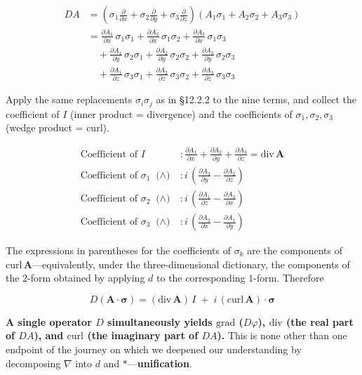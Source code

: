 \[
\begin{aligned}
D A &= (\sigma_1\tfrac{\partial}{\partial x} + \sigma_2\tfrac{\partial}{\partial y} + \sigma_3\tfrac{\partial}{\partial z})(A_1\sigma_1 + A_2\sigma_2 + A_3\sigma_3) \\[4pt]
&= \tfrac{\partial A_1}{\partial x}\,\sigma_1\sigma_1 + \tfrac{\partial A_2}{\partial x}\,\sigma_1\sigma_2 + \tfrac{\partial A_3}{\partial x}\,\sigma_1\sigma_3 \\
&\quad + \tfrac{\partial A_1}{\partial y}\,\sigma_2\sigma_1 + \tfrac{\partial A_2}{\partial y}\,\sigma_2\sigma_2 + \tfrac{\partial A_3}{\partial y}\,\sigma_2\sigma_3 \\
&\quad + \tfrac{\partial A_1}{\partial z}\,\sigma_3\sigma_1 + \tfrac{\partial A_2}{\partial z}\,\sigma_3\sigma_2 + \tfrac{\partial A_3}{\partial z}\,\sigma_3\sigma_3
\end{aligned}
\]

Apply the same replacements \(\sigma_i\sigma_j\) as in §12.2.2 to the
nine terms, and collect the coefficient of \(I\) (inner product =
divergence) and the coefficients of \(\sigma_1,\sigma_2,\sigma_3\)
(wedge product = curl).

\[
\begin{aligned}
\text{Coefficient of }I &: \frac{\partial A_1}{\partial x} + \frac{\partial A_2}{\partial y} + \frac{\partial A_3}{\partial z} = \mathrm{div}\,\mathbf{A} \\
\text{Coefficient of }\sigma_1\text{ ($\wedge$)} &: i\,\left(\frac{\partial A_3}{\partial y} - \frac{\partial A_2}{\partial z}\right) \\
\text{Coefficient of }\sigma_2\text{ ($\wedge$)} &: i\,\left(\frac{\partial A_1}{\partial z} - \frac{\partial A_3}{\partial x}\right) \\
\text{Coefficient of }\sigma_3\text{ ($\wedge$)} &: i\,\left(\frac{\partial A_2}{\partial x} - \frac{\partial A_1}{\partial y}\right)
\end{aligned}
\]

The expressions in parentheses for the coefficients of \(\sigma_k\) are
the components of \(\mathrm{curl}\,\mathbf{A}\)---equivalently, under
the three-dimensional dictionary, the components of the \(2\)-form
obtained by applying \(d\) to the corresponding \(1\)-form. Therefore

\[D(\mathbf{A}\!\cdot\!\bm{\sigma}) = (\mathrm{div}\,\mathbf{A})\,I \;+\; i\,(\mathrm{curl}\,\mathbf{A})\!\cdot\!\bm{\sigma}\]

\textbf{A single operator \(D\) simultaneously yields \(\mathrm{grad}\)
(\(D\varphi\)), \(\mathrm{div}\) (the real part of \(DA\)), and
\(\mathrm{curl}\) (the imaginary part of \(DA\)).} This is none other
than one endpoint of the journey on which we deepened our understanding
by decomposing \(\nabla\) into \(d\) and
\(\ast\)---\textbf{unification}.

